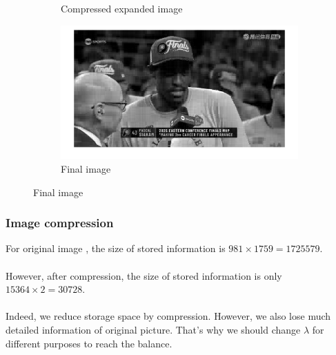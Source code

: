 \documentclass{beamer} %
\begin{document}
\begin{frame}
\begin{figure}[ht]
\begin{subfigure}[b]{0.45\textwidth}
			\caption{Compressed expanded image}
			\label{fig:20250803Siakam_expanded_compressed}
		\end{subfigure}
		\hfill %
		\begin{subfigure}[b]{0.45\textwidth}
			\includegraphics[width=\textwidth]{fig/Siakam_compressed.png}
			\caption{Final image}
			\label{fig:20250803Siakam_compressed}
		\end{subfigure}
		\label{fig:20250803process_total}
	\end{figure}
\end{frame}
\begin{frame}
	\frametitle{Image compression}
	For original image , the size of stored information is $981\times1759 = 1725579$. \\\ \\
	{\color{red} However, after compression, the size of stored information is  only $15364\times2 = 30728$.} \\\ \\
	Indeed, we reduce storage space by compression. However, we also lose much detailed information of original picture. That's why we should change $\lambda$ for different purposes to reach the balance.
\end{frame}
\end{document}
